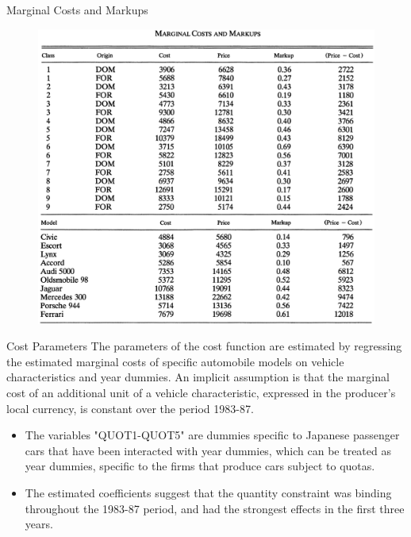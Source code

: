 \documentclass{beamer}
\begin{document}
\begin{frame}{Marginal Costs and Markups}
	\begin{figure}[h]
		\centering
		\includegraphics[scale=0.35]{table_4(2).png}
	\end{figure}
\end{frame}
\begin{frame}{Cost Parameters}
	The parameters of the cost function are estimated by regressing the estimated marginal costs of specific automobile models on vehicle characteristics and year dummies. An implicit assumption is that the marginal cost of an additional unit of a vehicle characteristic, expressed in the producer's local currency, is constant over the period 1983-87.
	\begin{itemize}
		\item The variables "QUOT1-QUOT5" are dummies specific to Japanese passenger cars that have been interacted with year dummies, which can be treated as year dummies, specific to the firms that produce cars subject to quotas.
		\item The estimated coefficients suggest that the quantity constraint was binding throughout the 1983-87 period, and had the strongest effects in the first three years.
	\end{itemize}
\end{frame}
\end{document}
